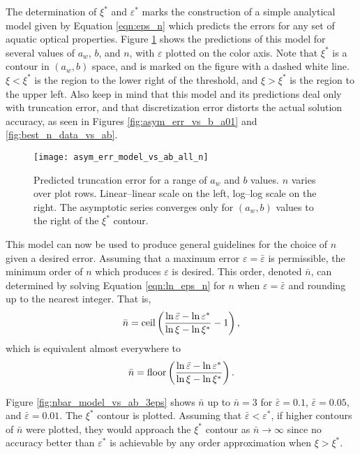 The determination of $\xi^*$ and $\varepsilon^*$ marks the construction of a simple analytical model given by Equation \eqref{eqn:eps_n} which predicts the errors for any set of aquatic optical properties.
Figure \ref{fig:asym_err_model_vs_ab_all_n} shows the predictions of this model for several values of $a_w$, $b$, and $n$, with $\varepsilon$ plotted on the color axis.
Note that $\xi^*$ is a contour in $(a_w, b)$ space, and is marked on the figure with a dashed white line.
$\xi<\xi^*$ is the region to the lower right of the threshold, and $\xi>\xi^*$ is the region to the upper left.
Also keep in mind that this model and its predictions deal only with truncation error, and that discretization error distorts the actual solution accuracy, as seen in Figures \ref{fig:asym_err_vs_b_a01} and \ref{fig:best_n_data_vs_ab}.

\begin{figure}[H]
  \centering
  \texttt{[image: asym\_err\_model\_vs\_ab\_all\_n]}
  \caption{Predicted truncation error for a range of $a_w$ and $b$ values. $n$ varies over plot rows. Linear--linear scale on the left, log--log scale on the right. The asymptotic series converges only for $(a_w,b)$ values to the right of the $\xi^*$ contour.}
  \label{fig:asym_err_model_vs_ab_all_n}
\end{figure}

This model can now be used to produce general guidelines for the choice of $n$ given a desired error.
Assuming that a maximum error $\varepsilon=\bar\varepsilon$ is permissible, the minimum order of $n$ which produces $\varepsilon$ is desired.
This order, denoted $\bar{n}$, can determined by solving Equation \eqref{eqn:ln_eps_n} for $n$ when $\varepsilon=\bar{\varepsilon}$ and rounding up to the nearest integer.
That is,
\begin{equation*}
  \bar{n} = \mbox{ceil}\left(\frac{\ln\bar{\varepsilon} - \ln\varepsilon^*}{\ln\xi - \ln\xi^*} - 1 \right),
\end{equation*}
which is equivalent almost everywhere to
\begin{equation}
  \label{eqn:n_bar}
  \bar{n} = \mbox{floor}\left(\frac{\ln\bar{\varepsilon} - \ln\varepsilon^*}{\ln\xi - \ln\xi^*}\right).
\end{equation}

Figure \ref{fig:nbar_model_vs_ab_3eps} shows $\bar{n}$ up to $\bar{n}=3$ for $\bar{\varepsilon}=0.1$, $\bar{\varepsilon}=0.05$, and $\bar{\varepsilon}=0.01$.
The $\xi^*$ contour is plotted.
Assuming that $\bar{\varepsilon}<\varepsilon^*$, if higher contours of $\bar{n}$ were plotted, they would approach the $\xi^*$ contour as $\bar{n} \to \infty$ since no accuracy better than $\varepsilon^*$ is achievable by any order approximation when $\xi > \xi^*$.

